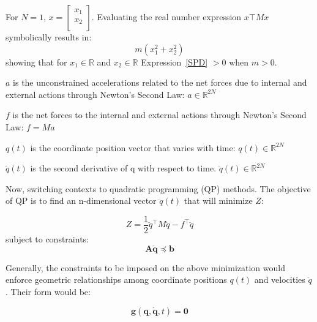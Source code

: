 \documentclass[12pt]{article} %
\begin{document}
	For $N = 1$, $x =  \begin{bmatrix} x_1 \\ x_2\\ \end{bmatrix}$. Evaluating the real number expression $x\top Mx$ symbolically results in:
	\begin{equation}
		m (x_1^2 + x_2^2)
		\label{SPD}
	\end{equation}
	showing that for $x_1 \in \mathbb{R}$ and $x_2 \in \mathbb{R}$ Expression~\ref{SPD} $> 0$ when $m > 0$. 
	
	$a$ is the unconstrained accelerations related to the net forces due to internal and external actions through Newton's Second Law: $a \in \mathbb{R}^{2N}$
	
	$f$ is the net forces to the internal and external actions through Newton's Second Law: $f = M a$ 
	
	$q(t)$ is the coordinate position vector that varies with time: $q(t) \in \mathbb{R}^{2N}$
	
	$\ddot{q}(t)$ is the second derivative of q with respect to time. $\ddot{q}(t) \in \mathbb{R}^{2N}$
	
	Now, switching contexts to quadratic programming (QP) methods. The objective of QP is to find an n-dimensional vector $\ddot{q}(t)$  that will minimize $Z$: 
	
	\begin{equation}
		Z = \frac{1}{2} \ddot{q}^\top M \ddot{q} - f^\top \ddot{q}
		\label{Z}
	\end{equation}
	subject to constraints:
	\begin{equation}
		\mathbf{A}\mathbf{\ddot{q}} \preccurlyeq \mathbf{b}
		\label{Z}
	\end{equation}
	
	Generally, the constraints to be imposed on the above minimization would enforce geometric relationships among coordinate positions $q(t)$ and velocities $\dot{q}$. Their form would be:
	
	\begin{equation}
		\mathbf{g}(\mathbf{q}, \mathbf{\dot{q}}, t) = \mathbf{0}
	\end{equation}
	
	
	
\end{document}

